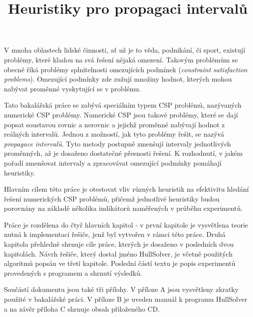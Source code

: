 \documentclass[thesis=B,czech]{FITthesis}[2012/06/26]
\title{Heuristiky pro propagaci intervalů}
\theoremstyle{definition}
\begin{document}

\begin{introduction}
V mnoha oblastech lidské činnosti, ať už je to věda, podnikání, či sport, existují problémy, které kladou na svá řešení nějaká omezení. Takovým problémům se obecně říká problémy splnitelnosti omezujících podmínek (\emph{constraint satisfaction problems}). Omezující podmínky zde zužují množiny hodnot, kterých mohou nabývat proměnné vyskytující se v problému.

Tato bakalářská práce se zabývá speciálním typem CSP problémů, nazývaných numerické CSP problémy. Numerické CSP jsou takové problémy, které se dají popsat soustavou rovnic a nerovnic a jejichž proměnné nabývají hodnot z reálných intervalů. Jednou z možností, jak tyto problémy řešit, se nazývá \emph{propagace intervalů}. Tyto metody postupně zmenšují intervaly jednotlivých proměnných, až je dosaženo dostatečné přesnosti řešení. K rozhodnutí, v jakém pořadí zmenšovat intervaly a zpracovávat omezující podmínky pomáhají heuristiky.

Hlavním cílem této práce je otestovat vliv různých heuristik na efektivitu hledání řešení numerických CSP problémů, přičemž jednotlivé heuristiky budou porovnány na základě několika indikátorů naměřených v průběhu experimentů.

Práce je rozdělena do čtyř hlavních kapitol - v první kapitole je vysvětlena teorie nutná k implementaci řešiče, jenž byl vytvořen v rámci této práce. Druhá kapitola přehledně shrnuje cíle práce, kterých je dosaženo v posledních dvou kapitolách. Návrh řešiče, který dostal jméno HullSolver, je včetně použitých algoritmů popsán ve třetí kapitole. Poslední částí textu je popis experimentů provedených s programem a shrnutí výsledků.

Součástí dokumentu jsou také tři přílohy. V příloze A jsou vysvětleny zkratky použité v bakalářské práci. V příloze B je uveden manuál k programu HullSolver a na závěr příloha C shrnuje obsah přiloženého CD.


\end{introduction}





\end{document}
